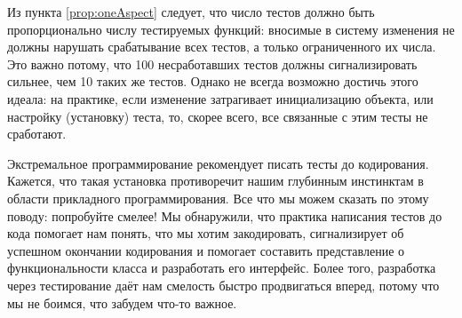 \documentclass[a4paper,10pt,twoside]{book}
\begin{document}
Из пункта \ref{prop:oneAspect} следует, что
число тестов должно быть пропорционально числу тестируемых функций:
вносимые в систему изменения не должны нарушать срабатывание всех тестов, а только ограниченного их числа.
Это важно потому, что 100 несработавших тестов должны сигнализировать сильнее, чем 10 таких же тестов.
Однако не всегда возможно достичь этого идеала:
на практике, если изменение затрагивает инициализацию объекта, или настройку (установку) теста,
то, скорее всего, все связанные с этим тесты не сработают.

Экстремальное программирование рекомендует писать тесты до кодирования.
Кажется, что такая установка противоречит нашим глубинным инстинктам в области прикладного программирования.
Все что мы можем сказать по этому поводу: попробуйте смелее!
Мы обнаружили, что практика написания тестов до кода помогает нам понять, что мы хотим закодировать,
сигнализирует об успешном окончании кодирования
и помогает составить представление о функциональности класса и разработать его интерфейс.
Более того, разработка через тестирование даёт нам смелость быстро продвигаться вперед,
потому что мы не боимся, что забудем что-то важное.


\end{document}
